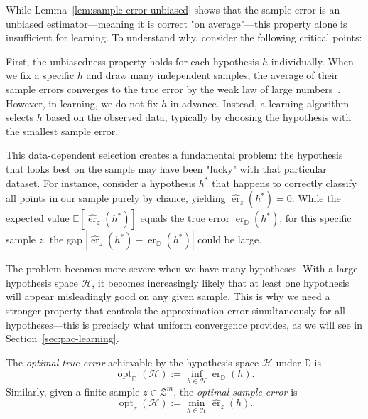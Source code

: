 \begin{remarknl}
    \label{rem:unbiased-not-enough}
    
    While Lemma~\ref{lem:sample-error-unbiased} shows that the sample error is an unbiased estimator—meaning it is correct "on average"—this property alone is insufficient for learning. To understand why, consider the following critical points:
    
    First, the unbiasedness property holds for each hypothesis $h$ individually. When we fix a specific $h$ and draw many independent samples, the average of their sample errors converges to the true error by the weak law of large numbers~\cite[Chap.~9]{MeasureTheoryLeGall}. However, in learning, we do not fix $h$ in advance. Instead, a learning algorithm selects $h$ based on the observed data, typically by choosing the hypothesis with the smallest sample error.
    
    This data-dependent selection creates a fundamental problem: the hypothesis that looks best on the sample may have been "lucky" with that particular dataset. For instance, consider a hypothesis $h^*$ that happens to correctly classify all points in our sample purely by chance, yielding $\hat{\operatorname{er}}_z(h^*) = 0$. While the expected value $\mathbb{E}[\hat{\operatorname{er}}_z(h^*)]$ equals the true error $\operatorname{er}_{\mathbb{D}}(h^*)$, for this specific sample $z$, the gap $|\hat{\operatorname{er}}_z(h^*) - \operatorname{er}_{\mathbb{D}}(h^*)|$ could be large.
    
    The problem becomes more severe when we have many hypotheses. With a large hypothesis space $\mathcal{H}$, it becomes increasingly likely that at least one hypothesis will appear misleadingly good on any given sample. This is why we need a stronger property that controls the approximation error simultaneously for all hypotheses—this is precisely what uniform convergence provides, as we will see in Section~\ref{sec:pac-learning}.
\end{remarknl}

\begin{definition}
    The \emph{optimal true error} achievable by the hypothesis space $\mathcal{H}$ under $\mathbb{D}$ is
    \[
        \operatorname{opt}_{\mathbb{D}}(\mathcal{H}) := \inf_{h\in\mathcal{H}} \operatorname{er}_{\mathbb{D}}(h).
    \]
    Similarly, given a finite sample $z \in \mathcal{Z}^m$, the \emph{optimal sample error} is
    \[
        \operatorname{opt}_{z}(\mathcal{H}) := \min_{h\in\mathcal{H}} \hat{\operatorname{er}}_{z}(h).
    \]
\end{definition}

